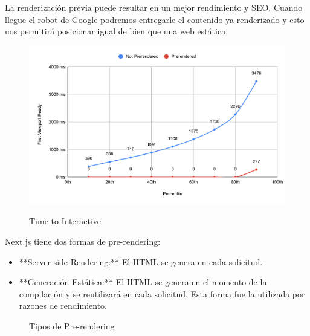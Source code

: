 \documentclass[12pt,twoside,titlepage]{report}
\begin{document}
\begin{itemize}
       La renderización previa puede resultar en un mejor rendimiento y SEO. Cuando llegue el robot de Google podremos entregarle el contenido ya renderizado y esto nos permitirá posicionar igual de bien que una web estática.

    \begin{figure}[H]
        \centering
        \includegraphics[scale=0.16]{Nextjs/PrerenderComparation}
        \label{fig:nextjs_prerenderinggraph}
        \caption{Time to Interactive}
    \end{figure}
    

    Next.js tiene dos formas de pre-rendering:
    \begin{itemize}
        \item **Server-side Rendering:** El HTML se genera en cada solicitud.
        \item **Generación Estática:** El HTML se genera en el momento de la compilación y se reutilizará en cada solicitud. Esta forma fue la utilizada por razones de rendimiento.
    \end{itemize}
    \begin{figure}[H]
        \centering
        \caption{Tipos de Pre-rendering}
        \label{f:TiposPrerendering}
       \end{figure}


\end{itemize}
\end{document}
